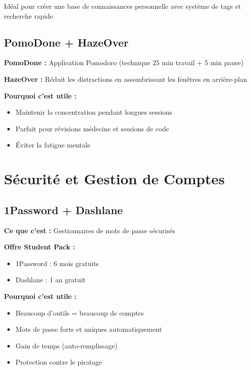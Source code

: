 \documentclass[11pt,a4paper]{article}
\begin{document}
\begin{conseil}
Idéal pour créer une base de connaissances personnelle avec système de tags et recherche rapide.
\end{conseil}

\subsection{PomoDone + HazeOver}

\textbf{PomoDone :} Application Pomodoro (technique 25 min travail + 5 min pause)

\textbf{HazeOver :} Réduit les distractions en assombrissant les fenêtres en arrière-plan

\textbf{Pourquoi c'est utile :}
\begin{itemize}
    \item Maintenir la concentration pendant longues sessions
    \item Parfait pour révisions médecine et sessions de code
    \item Éviter la fatigue mentale
\end{itemize}

\newpage
\section{Sécurité et Gestion de Comptes}

\subsection{1Password + Dashlane}

\textbf{Ce que c'est :} Gestionnaires de mots de passe sécurisés

\textbf{Offre Student Pack :}
\begin{itemize}
    \item 1Password : 6 mois gratuits
    \item Dashlane : 1 an gratuit
\end{itemize}

\textbf{Pourquoi c'est utile :}
\begin{itemize}
    \item Beaucoup d'outils = beaucoup de comptes
    \item Mots de passe forts et uniques automatiquement
    \item Gain de temps (auto-remplissage)
    \item Protection contre le piratage
\end{itemize}
\end{document}
